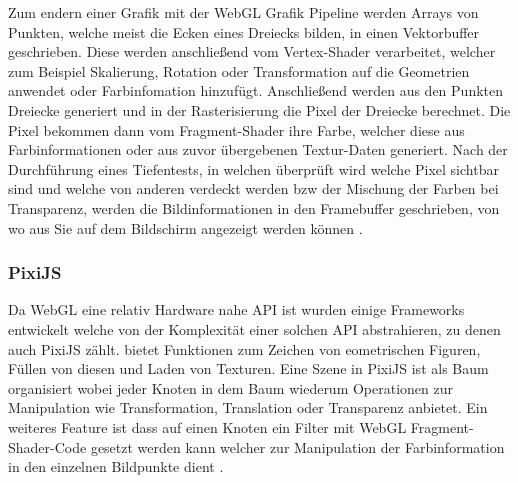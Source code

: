 Zum endern einer Grafik mit der WebGL Grafik Pipeline werden Arrays von Punkten, welche meist die Ecken eines Dreiecks bilden, in einen Vektorbuffer geschrieben.
Diese werden anschließend vom Vertex-Shader verarbeitet, welcher zum Beispiel Skalierung, Rotation oder Transformation auf die Geometrien anwendet oder Farbinfomation hinzufügt.
Anschließend werden aus den Punkten Dreiecke generiert und in der Rasterisierung die Pixel der Dreiecke berechnet.
Die Pixel bekommen dann vom Fragment-Shader ihre Farbe, welcher diese aus Farbinformationen oder aus zuvor übergebenen Textur-Daten generiert.
Nach der Durchführung eines Tiefentests, 
in welchen überprüft wird welche Pixel sichtbar sind und welche von anderen verdeckt werden bzw der Mischung der Farben bei Transparenz, 
werden die Bildinformationen in den Framebuffer geschrieben,
von wo aus Sie auf dem Bildschirm angezeigt werden können \cite{webgl-introduction}.


\subsubsection{PixiJS}
\label{sec:PixiJS}
Da WebGL eine relativ Hardware nahe API ist wurden einige Frameworks entwickelt welche von der Komplexität einer solchen API abstrahieren, zu denen auch PixiJS zählt.
 bietet Funktionen zum Zeichen von eometrischen Figuren, Füllen von diesen und Laden von Texturen.
Eine Szene in PixiJS ist als Baum organisiert\R{,} wobei jeder Knoten in dem Baum wiederum Operationen zur Manipulation wie Transformation, Translation oder Transparenz anbietet.
Ein weiteres Feature ist\R{,} dass auf einen Knoten ein Filter mit WebGL Fragment-Shader-Code gesetzt werden kann\R{,} welcher zur Manipulation der Farbinformation in den einzelnen Bildpunkte dient \cite{pixijs}.


